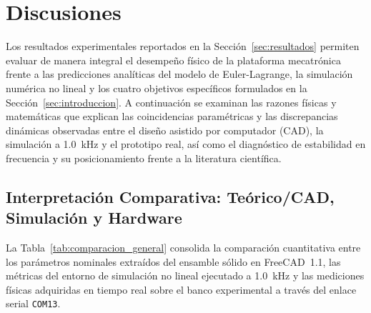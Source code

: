 \section{Discusiones}\label{sec:discusiones}

Los resultados experimentales reportados en la Sección~\ref{sec:resultados} permiten evaluar de manera integral el desempeño físico de la plataforma mecatrónica frente a las predicciones analíticas del modelo de Euler-Lagrange, la simulación numérica no lineal y los cuatro objetivos específicos formulados en la Sección~\ref{sec:introduccion}. A continuación se examinan las razones físicas y matemáticas que explican las coincidencias paramétricas y las discrepancias dinámicas observadas entre el diseño asistido por computador (CAD), la simulación a \qty{1.0}{\kilo\hertz} y el prototipo real, así como el diagnóstico de estabilidad en frecuencia y su posicionamiento frente a la literatura científica.

\subsection{Interpretación Comparativa: Teórico/CAD, Simulación y Hardware}\label{subsec:comparacion_general}

La Tabla~\ref{tab:comparacion_general} consolida la comparación cuantitativa entre los parámetros nominales extraídos del ensamble sólido en FreeCAD~1.1, las métricas del entorno de simulación no lineal ejecutado a \qty{1.0}{\kilo\hertz} y las mediciones físicas adquiridas en tiempo real sobre el banco experimental a través del enlace serial \texttt{COM13}.

